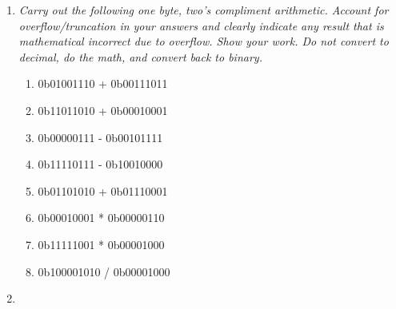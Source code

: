 \documentclass[nobib]{tufte-handout}
\begin{document}
\begin{enumerate}
    \item \textit{Carry out the following one byte, two's compliment arithmetic. Account for overflow/truncation in your answers and clearly indicate any result that is mathematical incorrect due to overflow. Show your work. Do not convert to decimal, do the math, and convert back to binary.}
    \begin{enumerate}
        \item 0b01001110 + 0b00111011
        \vspace{3in}
        \item 0b11011010 + 0b00010001
        \vspace{3in}
        \item 0b00000111 - 0b00101111
        \newpage \thispagestyle{empty}
        \item 0b11110111 - 0b10010000
        \vspace{3in}
        \item 0b01101010 + 0b01110001
        \vspace{3in}
        \newpage \thispagestyle{empty}
        \item 0b00010001 * 0b00000110
        \vspace{4in}
        \item 0b11111001 * 0b00001000 
        \newpage \thispagestyle{empty}
        \item 0b100001010 / 0b00001000         
    \end{enumerate}
    \item 



\end{enumerate}
\end{document}
